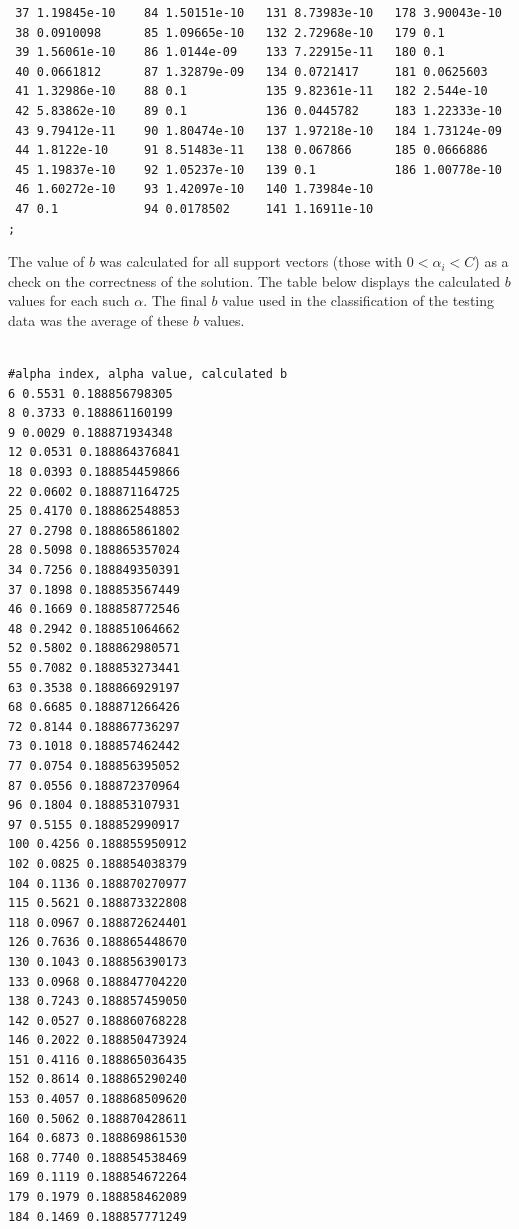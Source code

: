 \documentclass{article}
\begin{document}
\begin{verbatim}
 37 1.19845e-10    84 1.50151e-10   131 8.73983e-10   178 3.90043e-10
 38 0.0910098      85 1.09665e-10   132 2.72968e-10   179 0.1
 39 1.56061e-10    86 1.0144e-09    133 7.22915e-11   180 0.1
 40 0.0661812      87 1.32879e-09   134 0.0721417     181 0.0625603
 41 1.32986e-10    88 0.1           135 9.82361e-11   182 2.544e-10
 42 5.83862e-10    89 0.1           136 0.0445782     183 1.22333e-10
 43 9.79412e-11    90 1.80474e-10   137 1.97218e-10   184 1.73124e-09
 44 1.8122e-10     91 8.51483e-11   138 0.067866      185 0.0666886
 45 1.19837e-10    92 1.05237e-10   139 0.1           186 1.00778e-10
 46 1.60272e-10    93 1.42097e-10   140 1.73984e-10
 47 0.1            94 0.0178502     141 1.16911e-10
;

\end{verbatim}

The value of \(b\) was calculated for all support vectors (those with \(0 < \alpha_i < C\)) as a check on the correctness of the solution. The table below displays the calculated \(b\) values for each such \(\alpha\). The final \(b\) value used in the classification of the testing data was the average of these \(b\) values.

\begin{verbatim}

#alpha index, alpha value, calculated b
6 0.5531 0.188856798305
8 0.3733 0.188861160199
9 0.0029 0.188871934348
12 0.0531 0.188864376841
18 0.0393 0.188854459866
22 0.0602 0.188871164725
25 0.4170 0.188862548853
27 0.2798 0.188865861802
28 0.5098 0.188865357024
34 0.7256 0.188849350391
37 0.1898 0.188853567449
46 0.1669 0.188858772546
48 0.2942 0.188851064662
52 0.5802 0.188862980571
55 0.7082 0.188853273441
63 0.3538 0.188866929197
68 0.6685 0.188871266426
72 0.8144 0.188867736297
73 0.1018 0.188857462442
77 0.0754 0.188856395052
87 0.0556 0.188872370964
96 0.1804 0.188853107931
97 0.5155 0.188852990917
100 0.4256 0.188855950912
102 0.0825 0.188854038379
104 0.1136 0.188870270977
115 0.5621 0.188873322808
118 0.0967 0.188872624401
126 0.7636 0.188865448670
130 0.1043 0.188856390173
133 0.0968 0.188847704220
138 0.7243 0.188857459050
142 0.0527 0.188860768228
146 0.2022 0.188850473924
151 0.4116 0.188865036435
152 0.8614 0.188865290240
153 0.4057 0.188868509620
160 0.5062 0.188870428611
164 0.6873 0.188869861530
168 0.7740 0.188854538469
169 0.1119 0.188854672264
179 0.1979 0.188858462089
184 0.1469 0.188857771249

\end{verbatim}
\end{document}
